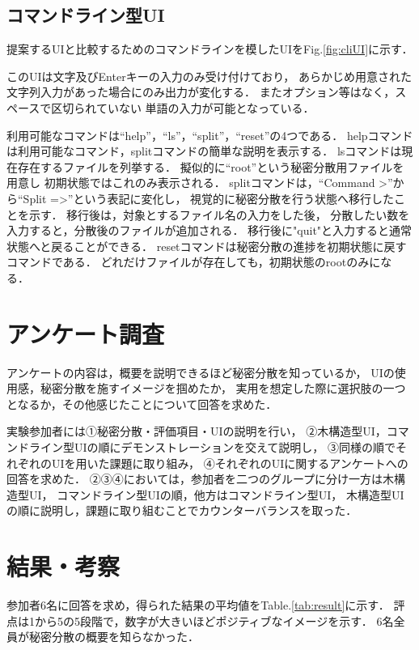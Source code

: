 \documentclass[twocolumn, fleqn, uplatex]{jsarticle}
\begin{document}
\subsection{コマンドライン型UI}
提案するUIと比較するためのコマンドラインを模したUIをFig.\ref{fig:cliUI}に示す．

このUIは文字及びEnterキーの入力のみ受け付けており，%
あらかじめ用意された文字列入力があった場合にのみ出力が変化する．%
またオプション等はなく，スペースで区切られていない%
単語の入力が可能となっている．

利用可能なコマンドは``help''，``ls''，``split''，``reset''の4つである．%
helpコマンドは利用可能なコマンド，splitコマンドの簡単な説明を表示する．%
lsコマンドは現在存在するファイルを列挙する．%
擬似的に``root''という秘密分散用ファイルを用意し%
初期状態ではこれのみ表示される．%
splitコマンドは，``Command >''から``Split =>''という表記に変化し，%
視覚的に秘密分散を行う状態へ移行したことを示す．%
移行後は，対象とするファイル名の入力をした後，%
分散したい数を入力すると，分散後のファイルが追加される．%
移行後に"quit"と入力すると通常状態へと戻ることができる．%
resetコマンドは秘密分散の進捗を初期状態に戻すコマンドである．%
どれだけファイルが存在しても，初期状態のrootのみになる．

\section{アンケート調査}
アンケートの内容は，概要を説明できるほど秘密分散を知っているか，%
UIの使用感，秘密分散を施すイメージを掴めたか，%
実用を想定した際に選択肢の一つとなるか，その他感じたことについて回答を求めた．

実験参加者には①秘密分散・評価項目・UIの説明を行い，%
②木構造型UI，コマンドライン型UIの順にデモンストレーションを交えて説明し，%
③同様の順でそれぞれのUIを用いた課題に取り組み，%
④それぞれのUIに関するアンケートへの回答を求めた．%
②③④においては，参加者を二つのグループに分け一方は木構造型UI，%
コマンドライン型UIの順，他方はコマンドライン型UI，%
木構造型UIの順に説明し，課題に取り組むことでカウンターバランスを取った．

\section{結果・考察}
参加者6名に回答を求め，得られた結果の平均値をTable.\ref{tab:result}に示す．
評点は1から5の5段階で，数字が大きいほどポジティブなイメージを示す．%
6名全員が秘密分散の概要を知らなかった．
\end{document}
